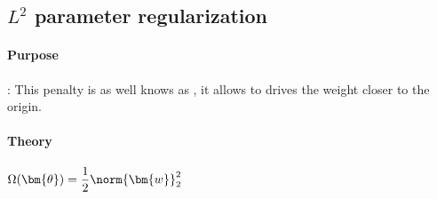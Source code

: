 \subsection{$L^{2}$ parameter regularization}
\paragraph{Purpose}: This penalty is as well knows as , it allows
to drives the weight closer to the origin.

\paragraph{Theory}
$\Omega(\bm{\theta}) = \dfrac{1}{2}\norm{\bm{w}}^{2}_{2}$
